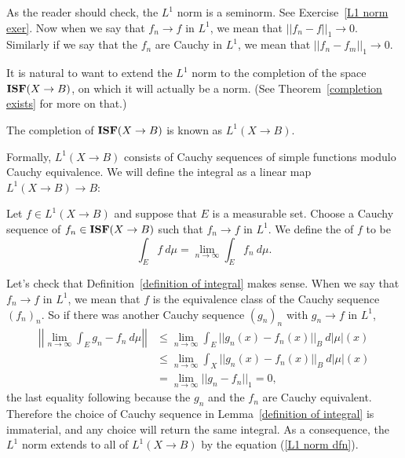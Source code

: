 \begin{subsec}
As the reader should check, the $L^1$ norm is a seminorm. See Exercise~\ref{L1 norm exer}.
Now when we say that $f_{n} \to f$ in $L^1$, we mean that $||f_{n} - f||_1 \to 0$. Similarly if we say that the $f_{n}$ are Cauchy in $L^1$, we mean that $||f_{n} - f_{m}||_1 \to 0$.
\end{subsec}

\begin{subsec}
It is natural to want to extend the $L^1$ norm to the completion of the space $\mathbf{ISF}(X \to B)$, on which it will actually be a norm.
(See Theorem~\ref{completion exists} for more on that.)
\end{subsec}

\begin{definition}
The completion of $\mathbf{ISF}(X \to B)$ is known as $L^1(X \to B)$.
\end{definition}

\begin{subsec}
Formally, $L^1(X \to B)$ consists of Cauchy sequences of simple functions modulo Cauchy equivalence.
We will define the integral as a linear map $L^1(X \to B) \to B$:
\end{subsec}

\begin{definition}
\label{definition of integral}
Let $f \in L^1(X \to B)$ and suppose that $E$ is a measurable set.
Choose a Cauchy sequence of $f_{n} \in \mathbf{ISF}(X \to B)$ such that $f_{n} \to f$ in $L^1$.
We define the  of $f$ to be
\[\int_{E} f~d\mu = \lim_{n \to \infty} \int_{E} f_{n}~d\mu.\]
\end{definition}

\begin{subsec}
Let's check that Definition~\ref{definition of integral} makes sense. When we say that $f_{n} \to f$ in $L^1$, we mean that $f$ is the equivalence class of the Cauchy sequence $(f_{n})_{n}$.
So if there was another Cauchy sequence $(g_{n})_{n}$ with $g_{n} \to f$ in $L^1$,
\begin{align*}\left|\left|\lim_{n \to \infty} \int_{E} g_{n} - f_{n} ~d\mu\right|\right| &\leq \lim_{n \to \infty} \int_{E} ||g_{n}(x) - f_{n}(x)||_{B} ~d|\mu|(x)\\&
\leq \lim_{n \to \infty} \int_{X} ||g_{n}(x) - f_{n}(x)||_{B} ~d|\mu|(x)
\\& = \lim_{n \to \infty} ||g_{n} - f_{n}||_1 = 0,
\end{align*}
the last equality following because the $g_{n}$ and the $f_{n}$ are Cauchy equivalent.
Therefore the choice of Cauchy sequence in Lemma~\ref{definition of integral} is immaterial, and any choice will return the same integral.
As a consequence, the $L^1$ norm extends to all of $L^1(X \to B)$ by the equation (\ref{L1 norm dfn}).
\end{subsec}

